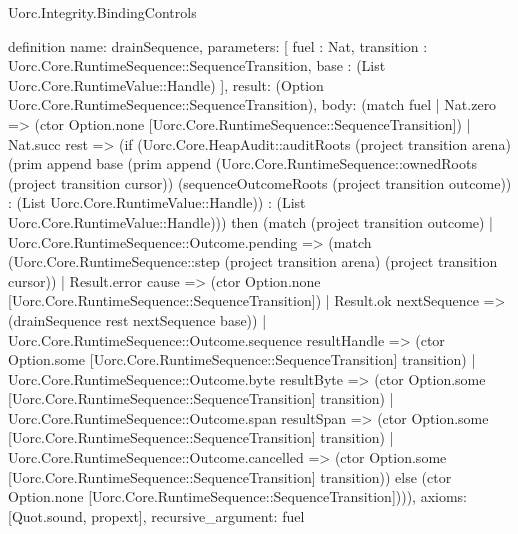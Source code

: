 \begin{lexlean}{Uorc.Integrity.BindingControls}
\begin{semanticmodule}
definition{
  name: drainSequence,
  parameters: [
    fuel : Nat,
    transition : Uorc.Core.RuntimeSequence::SequenceTransition,
    base : (List Uorc.Core.RuntimeValue::Handle)
  ],
  result: (Option Uorc.Core.RuntimeSequence::SequenceTransition),
  body: (match fuel
    | Nat.zero => (ctor Option.none [Uorc.Core.RuntimeSequence::SequenceTransition])
    | Nat.succ rest => (if (Uorc.Core.HeapAudit::auditRoots (project transition arena) (prim append base (prim append (Uorc.Core.RuntimeSequence::ownedRoots (project transition cursor)) (sequenceOutcomeRoots (project transition outcome)) : (List Uorc.Core.RuntimeValue::Handle)) : (List Uorc.Core.RuntimeValue::Handle))) then (match (project transition outcome)
      | Uorc.Core.RuntimeSequence::Outcome.pending => (match (Uorc.Core.RuntimeSequence::step (project transition arena) (project transition cursor))
        | Result.error cause => (ctor Option.none [Uorc.Core.RuntimeSequence::SequenceTransition])
        | Result.ok nextSequence => (drainSequence rest nextSequence base))
      | Uorc.Core.RuntimeSequence::Outcome.sequence resultHandle => (ctor Option.some [Uorc.Core.RuntimeSequence::SequenceTransition] transition)
      | Uorc.Core.RuntimeSequence::Outcome.byte resultByte => (ctor Option.some [Uorc.Core.RuntimeSequence::SequenceTransition] transition)
      | Uorc.Core.RuntimeSequence::Outcome.span resultSpan => (ctor Option.some [Uorc.Core.RuntimeSequence::SequenceTransition] transition)
      | Uorc.Core.RuntimeSequence::Outcome.cancelled => (ctor Option.some [Uorc.Core.RuntimeSequence::SequenceTransition] transition)) else (ctor Option.none [Uorc.Core.RuntimeSequence::SequenceTransition]))),
  axioms: [Quot.sound, propext],
  recursive_argument: fuel
}


\end{semanticmodule}
\end{lexlean}

